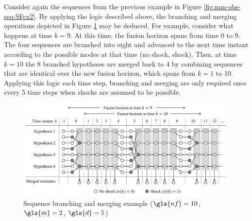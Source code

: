 Consider again the sequences from the previous example in Figure \ref{fig:mm-obs-seq-SFex2}. By applying the logic described above, the branching and merging operations depicted in Figure \ref{fig:mm-obs-seq-sf95} may be deduced. For example, consider what happens at time $k=9$. At this time, the fusion horizon spans from time 0 to 9. The four sequences are branched into eight and advanced to the next time instant according to the possible modes at that time (no shock, shock). Then, at time $k=10$ the 8 branched hypotheses are merged back to 4 by combining sequences that are identical over the new fusion horizon, which spans from $k=1$ to 10. Applying this logic each time step, branching and merging are only required once every 5 time steps when shocks are assumed to be possible.
\begin{figure}[ht]
	\centering
	\includegraphics[width=15.5cm]{images/mm_obs_seq_sf95.pdf}
	\caption{Sequence branching and merging example ($\gls{nf}=10$, $\gls{m}=2$, $\gls{d}=5$)}
	\label{fig:mm-obs-seq-sf95}
\end{figure}

